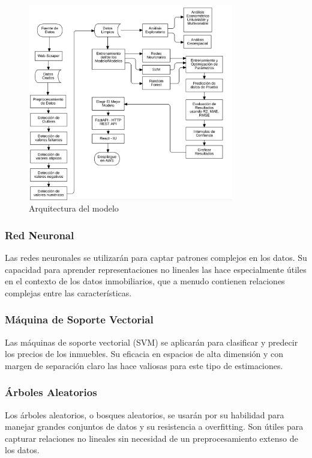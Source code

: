 \begin{figure}[H]
    \centering
    \includegraphics[width=0.8\textwidth]{imagenes/04-diseno/arquitectura-modelo.png}
    \caption{Arquitectura del modelo}
    \label{fig:arquitectura-modelo}
\end{figure}

\subsubsection{Red Neuronal}
Las redes neuronales se utilizarán para captar patrones complejos en los datos. Su
capacidad para aprender representaciones no lineales las hace especialmente útiles
en el contexto de los datos inmobiliarios, que a menudo contienen relaciones
complejas entre las características.

\subsubsection{Máquina de Soporte Vectorial}
Las máquinas de soporte vectorial (SVM) se aplicarán para clasificar y predecir
los precios de los inmuebles. Su eficacia en espacios de alta dimensión y con
margen de separación claro las hace valiosas para este tipo de estimaciones.

\subsubsection{Árboles Aleatorios}
Los árboles aleatorios, o bosques aleatorios, se usarán por su habilidad para
manejar grandes conjuntos de datos y su resistencia a overfitting. Son útiles
para capturar relaciones no lineales sin necesidad de un preprocesamiento extenso
de los datos.

